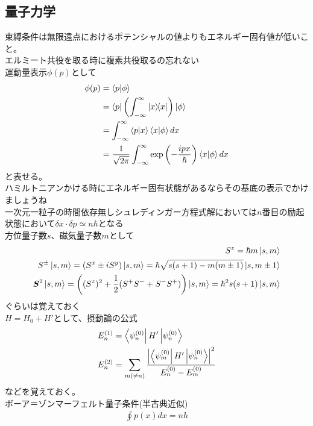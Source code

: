 \documentclass{ltjsarticle}
\begin{document}
  \subsection{量子力学}
  束縛条件は無限遠点におけるポテンシャルの値よりもエネルギー固有値が低いこと。\\
  エルミート共役を取る時に複素共役取るの忘れない\\
  運動量表示$\phi(p)$として
  \begin{align}
    \phi(p)
    &=\bra{p}\ket{\phi}\\
    &=\bra{p}\left( \int^\infty_{-\infty}\ketbra{x} \right) \ket{\phi}\\
    &=\int^\infty_{-\infty}\bra{p}\ket{x}\bra{x}\ket{\phi}dx\\
    &=\frac{1}{\sqrt{2\pi}}\int^\infty_{-\infty}\exp\left( -\frac{ipx}{\hbar} \right)\bra{x}\ket{\phi}dx\\
  \end{align}
  と表せる。\\
  ハミルトニアンかける時にエネルギー固有状態があるならその基底の表示でかけましょうね\\
  一次元一粒子の時間依存無しシュレディンガー方程式解においては$n$番目の励起状態において$\delta x\cdot \delta p\simeq n\hbar$となる\\
  方位量子数$s$、磁気量子数$m$として
  \begin{align}
    S^z=\hbar m\ket{s,m}\\
    S^\pm\ket{s,m}=(S^x\pm iS^y)\ket{s,m}=\hbar\sqrt{s(s+1)-m(m\pm 1)}\ket{s,m\pm 1}\\
    \bm{S}^2\ket{s,m}=\left((S^z)^2+\frac{1}{2}(S^+S^-+S^-S^+)\right)\ket{s,m}=\hbar^2s(s+1)\ket{s,m}\\
  \end{align}
  ぐらいは覚えておく\\
  $H=H_0+H'$として、摂動論の公式
  \begin{align}
    E_n^{(1)}&=\bra{\psi_n^{(0)}}H' \ket{\psi_n^{(0)}}\\
    E_n^{(2)}&=\sum_{m(\neq n)}\frac{\abs{\bra{\psi_m^{(0)}}H' \ket{\psi_n^{(0)}}}^2}{E_n^{(0)}-E_m^{(0)}}
  \end{align}
  などを覚えておく。\\
  ボーア＝ゾンマーフェルト量子条件(半古典近似)
  \begin{align}
    \oint p(x)dx=nh
  \end{align}
\end{document}
